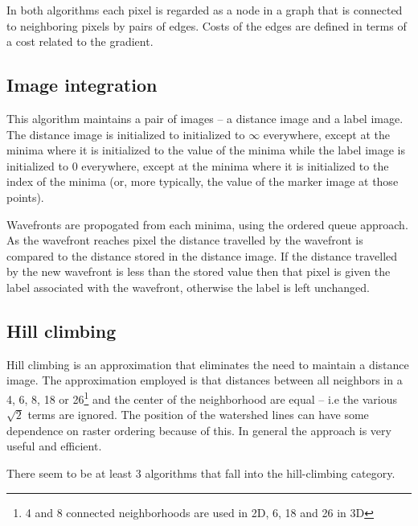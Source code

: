 \documentclass{InsightArticle}
\begin{document}
In both algorithms each pixel is regarded as a node in a graph that is
connected to neighboring pixels by pairs of edges. Costs of the edges
are defined in terms of a cost related to the gradient.

\subsection{Image integration}
This algorithm maintains a pair of images -- a distance image and a
label image. The distance image is initialized to initialized to
$\infty$ everywhere, except at the minima where it is initialized to
the value of the minima while the label image is initialized to $0$
everywhere, except at the minima where it is initialized to the index
of the minima (or, more typically, the value of the marker image at
those points).

Wavefronts are propogated from each minima, using the ordered queue
approach. As the wavefront reaches pixel the distance travelled by the
wavefront is compared to the distance stored in the distance image. If
the distance travelled by the new wavefront is less than the stored
value then that pixel is given the label associated with the
wavefront, otherwise the label is left unchanged.

\subsection{Hill climbing}
Hill climbing is an approximation that eliminates the need to maintain
a distance image. The approximation employed is that distances between
all neighbors in a 4, 6, 8, 18 or 26\footnote{4 and 8 connected
neighborhoods are used in 2D, 6, 18 and 26 in 3D} and the center of
the neighborhood are equal -- i.e the various $\sqrt{2}$ terms are
ignored. The position of the watershed lines can have some dependence
on raster ordering because of this. In general the approach is very
useful and efficient.

There seem to be at least 3 algorithms that fall into the
hill-climbing category.

\end{document}
